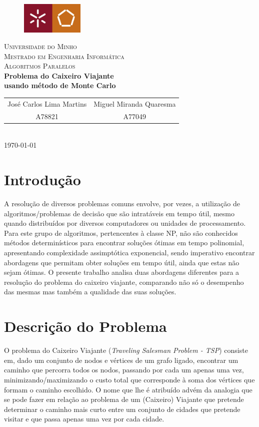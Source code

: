 \documentclass{article}
\begin{document}
{
\center
\begin{figure}[H]
        \centering
        \includegraphics[width=3cm]{Pictures/UM_EENG.jpg}
\end{figure}
\textsc{\Large Universidade do Minho} \\ [0.5cm]
\textsc{\Large Mestrado em Engenharia Informática} \\ [0.5cm]
\textsc{\large Algoritmos Paralelos} \\ [0.5cm]

{\LARGE \bfseries Problema do Caixeiro Viajante \\ usando método de Monte Carlo} \\[0.5cm]

\begin{tabular}{c c}
    José Carlos Lima Martins & Miguel Miranda Quaresma \\
    A78821 & A77049  \\
\end{tabular} \\[0.5cm]

\today \\[1cm]
}

\section{Introdução}
A resolução de diversos problemas comuns envolve, por vezes, a utilização de algoritmos/problemas de decisão que são intratáveis em tempo útil, mesmo quando 
distribuídos por diversos computadores ou unidades de processamento. Para este grupo de algoritmos, pertencentes à classe NP, não são conhecidos métodos 
determinísticos para encontrar soluções ótimas em tempo polinomial, apresentando complexidade assimptótica exponencial, sendo imperativo encontrar abordagens que permitam obter soluções em tempo útil, ainda que estas não sejam ótimas. O presente trabalho analisa duas abordagens diferentes para a resolução do problema do 
caixeiro viajante, comparando não só o desempenho das mesmas mas também a qualidade das suas soluções.

\section{Descrição do Problema}

O problema do Caixeiro Viajante (\textit{Traveling Salesman Problem - TSP}) consiste em, dado um conjunto de nodos e vértices de um grafo ligado, encontrar um caminho
que percorra todos os nodos, passando por cada um apenas uma vez, minimizando/maximizando o custo total que corresponde à soma dos vértices que formam o caminho 
escolhido. O nome que lhe é atribuído advém da analogia que se pode fazer em relação ao problema de um (Caixeiro) Viajante que pretende determinar o caminho mais curto 
entre um conjunto de cidades que pretende visitar e que passa apenas uma vez por cada cidade.
\end{document}
